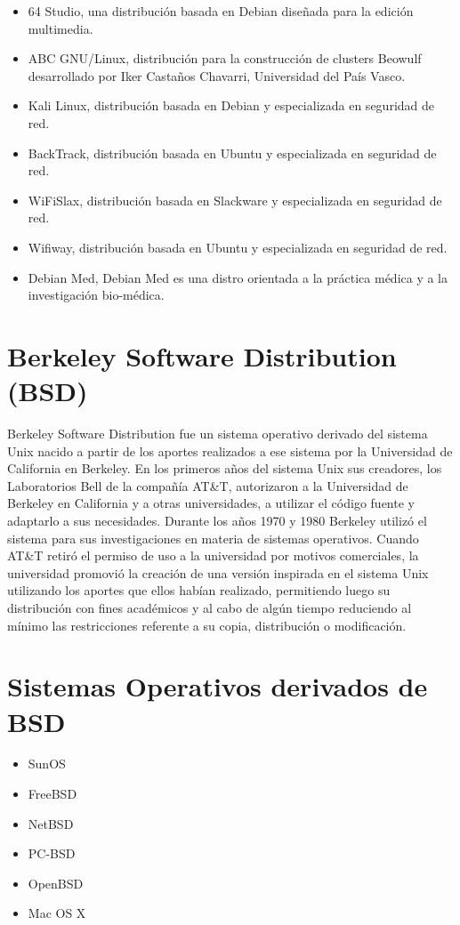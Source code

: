 \begin{itemize}
\item 64 Studio, una distribución basada en Debian diseñada para la edición multimedia.
\item ABC GNU/Linux, distribución para la construcción de clusters Beowulf desarrollado por Iker Castaños Chavarri, Universidad del País Vasco.
\item Kali Linux, distribución basada en Debian y especializada en seguridad de red.
\item BackTrack, distribución basada en Ubuntu y especializada en seguridad de red.
\item WiFiSlax, distribución basada en Slackware y especializada en seguridad de red.
\item Wifiway, distribución basada en Ubuntu y especializada en seguridad de red.
\item Debian Med, Debian Med es una distro orientada a la práctica médica y a la investigación bio-médica.
\end{itemize}

\section{Berkeley Software Distribution (BSD)}

Berkeley Software Distribution fue un sistema operativo derivado del sistema Unix nacido a partir de los aportes realizados a ese sistema por la Universidad de California en Berkeley. En los primeros años del sistema Unix sus creadores, los Laboratorios Bell de la compañía AT\&T, autorizaron a la Universidad de Berkeley en California y a otras universidades, a utilizar el código fuente y adaptarlo a sus necesidades. Durante los años 1970 y 1980 Berkeley utilizó el sistema para sus investigaciones en materia de sistemas operativos. Cuando AT\&T retiró el permiso de uso a la universidad por motivos comerciales, la universidad promovió la creación de una versión inspirada en el sistema Unix utilizando los aportes que ellos habían realizado, permitiendo luego su distribución con fines académicos y al cabo de algún tiempo reduciendo al mínimo las restricciones referente a su copia, distribución o modificación.

\section{Sistemas Operativos derivados de BSD}

\begin{itemize}
	\item SunOS
	\item FreeBSD
	\item NetBSD
	\item PC-BSD
	\item OpenBSD
	\item Mac OS X
\end{itemize}

